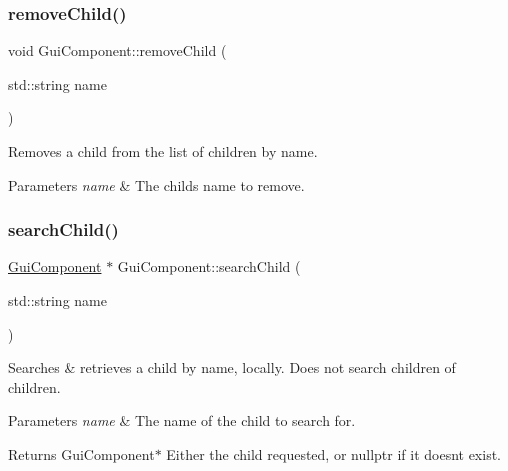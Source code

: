 \subsubsection{\texorpdfstring{remove\+Child()}{removeChild()}}
{\footnotesize\ttfamily void Gui\+Component\+::remove\+Child (\begin{DoxyParamCaption}\item[{std\+::string}]{name }\end{DoxyParamCaption})\hspace{0.3cm}{\ttfamily [virtual]}}



Removes a child from the list of children by name. 


\begin{DoxyParams}{Parameters}
{\em name} & The child\textquotesingle{}s name to remove. \\
\hline
\end{DoxyParams}
\mbox{\label{class_gui_component_a2167444f909f08b7be3805309d7ad831}} 
\subsubsection{\texorpdfstring{search\+Child()}{searchChild()}}
{\footnotesize\ttfamily \mbox{\hyperlink{class_gui_component}{Gui\+Component}} $\ast$ Gui\+Component\+::search\+Child (\begin{DoxyParamCaption}\item[{std\+::string}]{name }\end{DoxyParamCaption})\hspace{0.3cm}{\ttfamily [virtual]}}



Searches \& retrieves a child by name, locally. Does not search children of children. 


\begin{DoxyParams}{Parameters}
{\em name} & The name of the child to search for. \\
\hline
\end{DoxyParams}
\begin{DoxyReturn}{Returns}
Gui\+Component$\ast$ Either the child requested, or nullptr if it doesn\textquotesingle{}t exist. 
\end{DoxyReturn}
\mbox{\label{class_gui_component_a7f1e0e731d458135182850a53de06f95}} 
